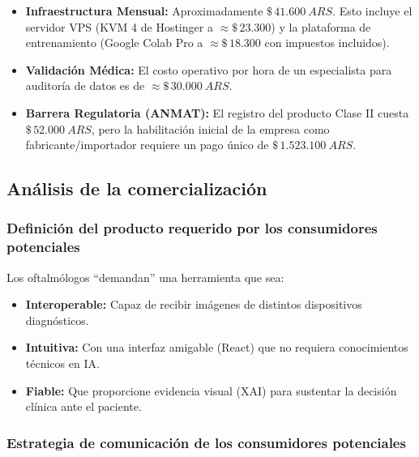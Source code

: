             \begin{itemize}[leftmargin=*]
                \item \textbf{Infraestructura Mensual:} Aproximadamente $ \$\,41.600\:ARS$. Esto incluye el servidor VPS (KVM 4 de Hostinger a $\approx \$\, 23.300$) y la plataforma de entrenamiento (Google Colab Pro a $\approx \$\,18.300$ con impuestos incluidos).  
    
                \item \textbf{Validación Médica:} El costo operativo por hora de un especialista para auditoría de datos es de $\approx\$\,30.000 \: ARS$.  
    
                \item \textbf{Barrera Regulatoria (ANMAT):} El registro del producto Clase II cuesta $\$\,52.000 \:ARS$, pero la habilitación inicial de la empresa como fabricante/importador requiere un pago único de $ \$\,1.523.100 \:ARS$.
            \end{itemize}

        \subsection{Análisis de la comercialización}
        
            \subsubsection{Definición del producto requerido por los consumidores potenciales}
        
            Los oftalmólogos ``demandan'' una herramienta que sea:
        
            \begin{itemize}
                \item \textbf{Interoperable:} Capaz de recibir imágenes de distintos dispositivos diagnósticos.  
        
                \item \textbf{Intuitiva:} Con una interfaz amigable (React) que no requiera conocimientos técnicos en IA.  
        
                \item \textbf{Fiable:} Que proporcione evidencia visual (XAI) para sustentar la decisión clínica ante el paciente.
            \end{itemize}
        
            \subsubsection{Estrategia de comunicación de los consumidores potenciales}
        
